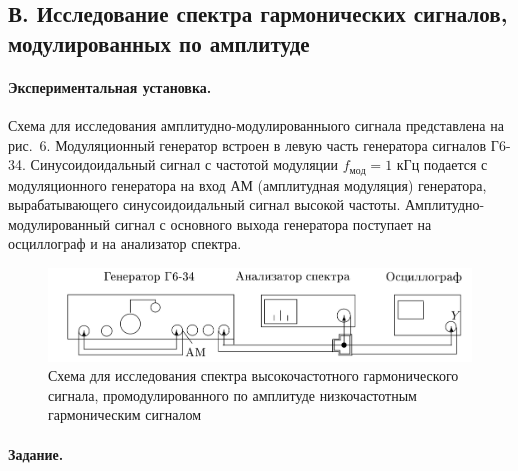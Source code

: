 \documentclass[a4paper, 12pt]{article}
\newcommand{\mysec}[1]{\begin{center}\section*{#1}\end{center}}
\begin{document}
    \mysec{В. Исследование спектра гармонических сигналов, модулированных по амплитуде}
    
    \paragraph*{Экспериментальная установка.} Схема для исследования амплитудно-модулированныого сигнала представлена на рис.~6. Модуляционный генератор встроен в левую часть генератора сигналов Г6-34. Синусоидоидальный сигнал с частотой модуляции $f_{мод} = 1$ кГц подается с модуляционного генератора на вход АМ (амплитудная модуляция) генератора, вырабатывающего синусоидоидальный сигнал высокой частоты. Амплитудно-модулированный сигнал с основного выхода генератора поступает на осциллограф и на анализатор спектра.

    \begin{figure}
        \includegraphics[scale=0.3]{pic4.png}
        \caption{Схема для исследования спектра высокочастотного гармонического сигнала, промодулированного по амплитуде низкочастотным гармоническим сигналом}
    \end{figure}

    \paragraph*{Задание.}
\end{document}
